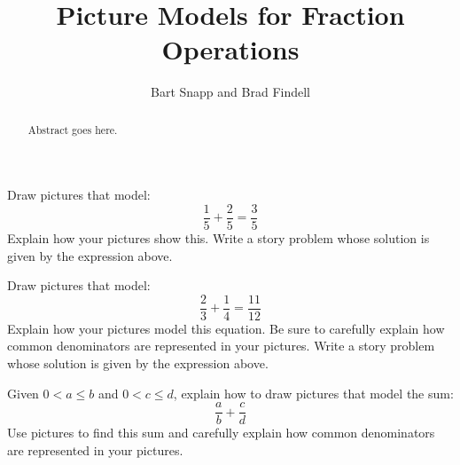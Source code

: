 \documentclass{ximera}
\title{Picture Models for Fraction Operations}
\author{Bart Snapp and Brad Findell}
\begin{document}
\begin{abstract}
Abstract goes here.  
\end{abstract}
\maketitle

\label{A:FO}
\begin{problem} 
Draw pictures that model:
\[
\frac{1}{5} + \frac{2}{5} = \frac{3}{5}
\]
Explain how your pictures show this. Write a story problem whose
solution is given by the expression above.
\end{problem}

\begin{problem} 
Draw pictures that model:
\[
\frac{2}{3} + \frac{1}{4} = \frac{11}{12}
\]
Explain how your pictures model this equation. Be sure to carefully
explain how common denominators are represented in your
pictures. Write a story problem whose solution is given by the
expression above.
\end{problem}

\begin{problem} 
Given $0<a\le b$ and $0<c\le d$, explain how to draw pictures
that model the sum:
\[
\frac{a}{b} + \frac{c}{d}
\]
Use pictures to find this sum and carefully explain how common
denominators are represented in your pictures.
\end{problem}

%
%
%
\end{document}
